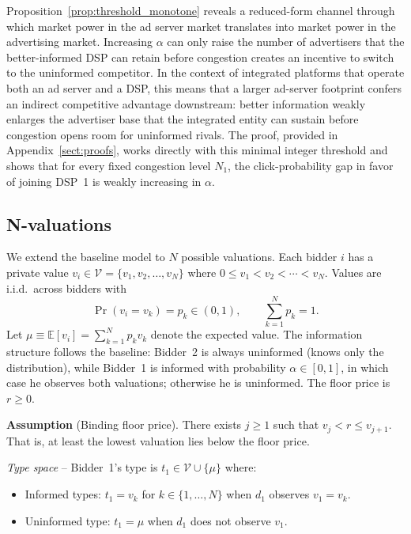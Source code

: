 \noindent Proposition~\ref{prop:threshold_monotone} reveals a reduced-form channel through which market power in the ad server market translates into market power in the advertising market. Increasing $\alpha$ can only raise the number of advertisers that the better-informed DSP can retain before congestion creates an incentive to switch to the uninformed competitor. In the context of integrated platforms that operate both an ad server and a DSP, this means that a larger ad-server footprint confers an indirect competitive advantage downstream: better information weakly enlarges the advertiser base that the integrated entity can sustain before congestion opens room for uninformed rivals. The proof, provided in Appendix~\ref{sect:proofs}, works directly with this minimal integer threshold and shows that for every fixed congestion level $N_1$, the click-probability gap in favor of joining DSP~1 is weakly increasing in $\alpha$.

\subsection{N-valuations}\label{sect:N-values}

We extend the baseline model to $N$ possible valuations. Each bidder $i$ has a private value $v_i \in \mathcal{V} = \{v_1, v_2, \ldots, v_N\}$ where $0 \leq v_1 < v_2 < \cdots < v_N$. Values are i.i.d.\ across bidders with
\[
\Pr(v_i = v_k) = p_k \in (0,1), \qquad \sum_{k=1}^N p_k = 1.
\]
Let $\mu \equiv \mathbb{E}[v_i] = \sum_{k=1}^N p_k v_k$ denote the expected value. The information structure follows the baseline: Bidder~2 is always uninformed (knows only the distribution), while Bidder~1 is informed with probability $\alpha \in [0,1]$, in which case he observes both valuations; otherwise he is uninformed. The floor price is $r \geq 0$.

\noindent \textbf{Assumption} (Binding floor price). There exists $j \geq 1$ such that $v_j < r \leq v_{j+1}$. That is, at least the lowest valuation lies below the floor price.

\noindent \emph{Type space} -- Bidder~1's type is $t_1 \in \mathcal{V} \cup \{\mu\}$ where:
\begin{itemize}
    \item Informed types: $t_1 = v_k$ for $k \in \{1, \ldots, N\}$ when $d_1$ observes $v_1 = v_k$.
    \item Uninformed type: $t_1 = \mu$ when $d_1$ does not observe $v_1$.
\end{itemize}

